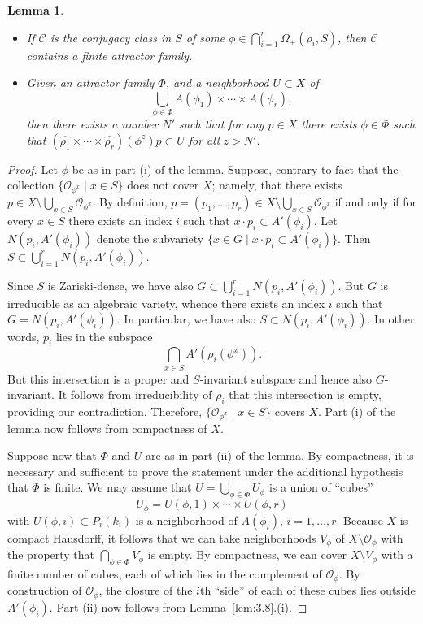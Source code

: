 \documentclass{amsart}
\theoremstyle{plain}
\newtheorem{lemma}[theorem]{Lemma}
\theoremstyle{definition}
\theoremstyle{remark}
\begin{document}
\begin{lemma}\label{simulunnec}
\begin{itemize}
\item[(i)] If  $\mathcal{C}$ is the
conjugacy class in $S$ of some $\phi \in
\bigcap_{i
=1}^{r}\Omega_{+}(\rho_{i}, S)$, then $\mathcal{C}$ contains a \emph{finite} attractor
family.
\item[(ii)] Given an attractor family $\Phi$, and a neighborhood $U \subset X$ of
$$\bigcup_{\phi \in \Phi} A(\phi_{1})\times\cdots\times A(\phi_{r}),$$
then there exists a number
$N'$ such that for any $p \in X$ there exists $\phi \in \Phi$ such
that $(\widehat{\rho_{1}} \times\cdots\times \widehat{\rho_{r}})(\phi^{z}) p \subset U$ for
all $z > N'$.
\end{itemize}
\end{lemma}
\begin{proof}
Let $\phi$ be as in part (i) of the lemma. Suppose, contrary to fact that the
collection
$\{\mathcal{O}_{\phi^{x}}\mid x \in S\}$ does not cover $X$; namely, that there exists
$p \in X\setminus \bigcup_{x \in S}\mathcal{O}_{\phi^{x}}$.
By definition, $p = (p_{1},\ldots, p_{r}) \in X\setminus \bigcup_{x \in S}\mathcal{O}_{\phi^{x}}$ if and only if for every $x
\in S$ there exists
an index $i$ such that $x\cdot p_{i} \subset A'(\phi_{i})$. Let $N(p_{i}, A'(\phi_{i}))$ denote
the 
subvariety $\lbrace x \in G \mid x\cdot p_{i} \subset A'(\phi_{i})\rbrace$. Then $S \subset \bigcup_{i = 1}^{r} N(p_{i},
A'(\phi_{i}))$.

Since $S$ is Zariski-dense, we have also $G \subset \bigcup_{i = 1}^{r} N(p_{i},
A'(\phi_{i}))$. But $G$ is irreducible as an algebraic variety, whence there exists an
index $i$ such that $G = N(p_{i}, A'(\phi_{i}))$. In particular, we have also
$S \subset N(p_{i}, A'(\phi_{i}))$. In other words, $p_{i}$ lies in the subspace
$$\bigcap_{x\in S} A'(\rho_{i}(\phi^{x})).$$ But this intersection is a proper and
$S$-invariant subspace and hence also $G$-invariant. It follows from irreducibility of
$\rho_{i}$ that this intersection is empty, providing our contradiction. Therefore,
$\{\mathcal{O}_{\phi^{x}}\mid x \in S\}$ covers $X$. Part (i) of the lemma now
follows from compactness of $X$.

Suppose now that $\Phi$ and $U$ are as in part (ii) of the lemma. By compactness, it
is necessary and sufficient to prove the statement under the additional hypothesis that
$\Phi$ is finite.
We may assume that $U = \bigcup_{\phi \in \Phi} U_{\phi}$ is a union of ``cubes''
$$U_{\phi} = U(\phi, 1)\times\cdots\times U(\phi, r)$$
with $U(\phi, i)\subset P_{i}(k_{i})$ is a neighborhood of $A(\phi_{i})$, $i = 1,\ldots, r$.
Because $X$ is compact
Hausdorff, it follows that we can take neighborhoods $V_{\phi}$ of $X\setminus\mathcal{O}_{\phi}$
with the
property that $\bigcap_{\phi \in \Phi} V_{\phi}$ is empty. By compactness, we can cover
$X\setminus V_{\phi}$ with a finite number of cubes, each of which lies in the
complement of $\mathcal{O}_{\phi}$. By construction of $\mathcal{O}_{\phi}$, the closure of
the $i$th ``side'' of each of these cubes lies outside $A'(\phi_{i})$.
Part (ii) now follows from Lemma~\ref{lem:3.8}.(i).
\end{proof}
\end{document}
